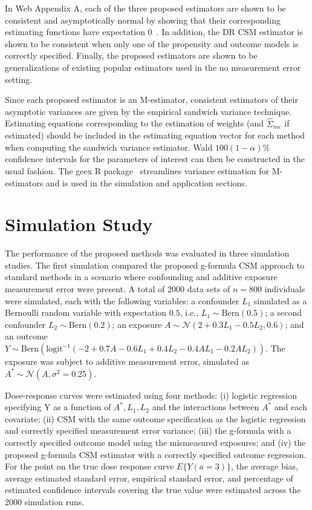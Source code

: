 \documentclass[useAMS,usenatbib,referee]{biom}
\begin{document}
In Web Appendix A, each of the three proposed estimators are shown to be consistent and asymptotically normal by showing that their corresponding estimating functions have expectation 0~\citep{stefanski2002}. In addition, the DR CSM estimator is shown to be consistent when only one of the propensity and outcome models is correctly specified. Finally, the proposed estimators are shown to be generalizations of existing popular estimators used in the no measurement error setting.

Since each proposed estimator is an M-estimator, consistent estimators of their asymptotic variances are given by the empirical sandwich variance technique. Estimating equations corresponding to the estimation of weights (and $\hat{\Sigma}_{me}$ if estimated) should be included in the estimating equation vector for each method when computing the sandwich variance estimator. Wald $100(1-\alpha)\%$ confidence intervals for the parameters of interest can then be constructed in the usual fashion. The geex R package~\citep{saul2017} streamlines variance estimation for M-estimators and is used in the simulation and application sections.

\section{Simulation Study}

The performance of the proposed methods was evaluated in three simulation studies. The first simulation compared the proposed g-formula CSM approach to standard methods in a scenario where confounding and additive exposure measurement error were present. A total of 2000 data sets of $n = 800$ individuals were simulated, each with the following variables: a confounder $L_{1}$ simulated as a Bernoulli random variable with expectation $0.5$, i.e., $L_{1} \sim \text{Bern}(0.5)$; a second confounder $L_{2} \sim \text{Bern}(0.2)$; an exposure $A \sim \mathcal{N}(2 + 0.3L_{1} - 0.5L_{2}, 0.6)$; and an outcome $Y \sim \text{Bern}(\text{logit}^{-1}(-2 + 0.7A - 0.6L_{1} + 0.4L_{2} - 0.4AL_{1} - 0.2AL_{2}))$. The exposure was subject to additive measurement error, simulated as $A^{*} \sim \mathcal{N}(A, \sigma^{2} = 0.25)$.

Dose-response curves were estimated using four methods: (i) logistic regression specifying Y as a function of $A^{*}, L_{1}, L_{2}$ and the interactions between $A^{*}$ and each covariate; (ii) CSM with the same outcome specification as the logistic regression and correctly specified measurement error variance; (iii) the g-formula with a correctly specified outcome model using the mismeasured exposures; and (iv) the proposed g-formula CSM estimator with a correctly specified outcome regression. For the point on the true dose response curve $E\{ Y(a = 3) \}$, the average bias, average estimated standard error, empirical standard error, and percentage of estimated confidence intervals covering the true value were estimated across the 2000 simulation runs.
\end{document}
